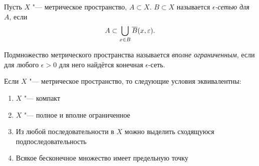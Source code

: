 \documentclass[main]{subfiles}
\begin{document}
\begin{definition}
  Пусть \( X \) "--- метрическое пространство, \( A \subset X \).
  \( B \subset X \) называется \emph{\(\epsilon\)-сетью для \( A \)},
  если
  \[
    A \subset \bigcup_{x \in B} \overline{B}(x, \varepsilon).
  \]
\end{definition}

\begin{definition}
  Подмножество метрического пространства называется
  \emph{вполне ограниченным}, если для любого
  \( \epsilon > 0 \) для него найдётся конечная \( \epsilon \)-сеть.
\end{definition}

\begin{theorem}\label{thm:compact}
  Если \( X \) "--- метрическое пространство,
  то следующие условия эквивалентны:
  \begin{enumerate}
    \item \( X \) "--- компакт
    \item \( X \) "--- полное и вполне ограниченное
    \item Из любой последовательности в \( X \)
      можно выделить сходящуюся подпоследовательность
    \item Всякое бесконечное множество имеет предельную точку
  \end{enumerate}
\end{theorem}
\end{document}
